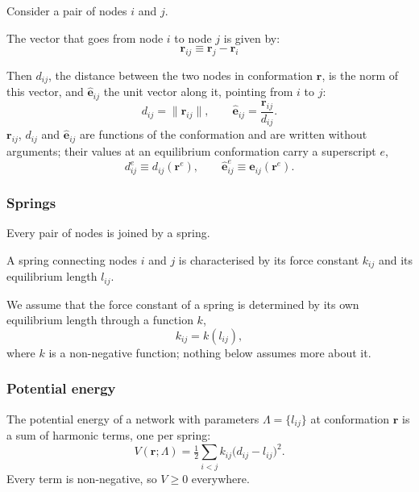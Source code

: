 \documentclass[11pt]{article}
\newcommand{\rr}{\mathbf{r}}
\newcommand{\ee}{\hat{\mathbf{e}}}
\newcommand{\LL}{\Lambda}
\newcommand{\re}{\rr^{e}}
\newcommand{\rrij}{\mathbf{r}_{ij}}
\newcommand{\eeij}{\ee_{ij}}
\newcommand{\eeije}{\ee^{e}_{ij}}
\newcommand{\dije}{d^{e}_{ij}}
\newcommand{\lij}{l_{ij}}
\newcommand{\kij}{k_{ij}}
\newcommand{\dij}{d_{ij}}
\begin{document}
Consider a pair of nodes $i$ and $j$.

The vector that goes from node $i$ to node $j$ is given by:
\begin{equation}
\rrij \equiv \rr_j - \rr_i
\end{equation}

Then $\dij$, the distance between the two nodes in conformation $\rr$, is the norm of this vector, and $\eeij$ the unit vector along it, pointing from $i$ to $j$:
\begin{equation}
\dij = \lVert \rrij \rVert,
\qquad
\eeij = \frac{\rrij}{\dij}.
\label{eq:distance}
\end{equation}
$\rrij$, $\dij$ and $\eeij$ are functions of the conformation and are written without arguments; their values at an equilibrium conformation carry a superscript $e$,
\begin{equation}
\dije \equiv \dij(\re),
\qquad
\eeije \equiv \eeij(\re).
\label{eq:equilibrium-values}
\end{equation}

\subsubsection{Springs}

Every pair of nodes is joined by a spring.

A spring connecting nodes $i$ and $j$ is characterised by its force constant $\kij$ and its equilibrium length $\lij$.

We assume that the force constant of a spring is determined by its own equilibrium length through a function $k$,
\begin{equation}
\kij = k(\lij),
\label{eq:stiffness-from-length}
\end{equation}
where $k$ is a non-negative function; nothing below assumes more about it.

\subsubsection{Potential energy}

The potential energy of a network with parameters $\LL = \{\lij\}$ at conformation $\rr$ is a sum of harmonic terms, one per spring:
\begin{equation}
\boxed{
V(\rr; \LL)  = \tfrac12 \sum_{i<j} \kij \big(\dij - \lij\big)^{2}.
}
\label{eq:potential}
\end{equation}
Every term is non-negative, so $V \ge 0$ everywhere.
\end{document}
